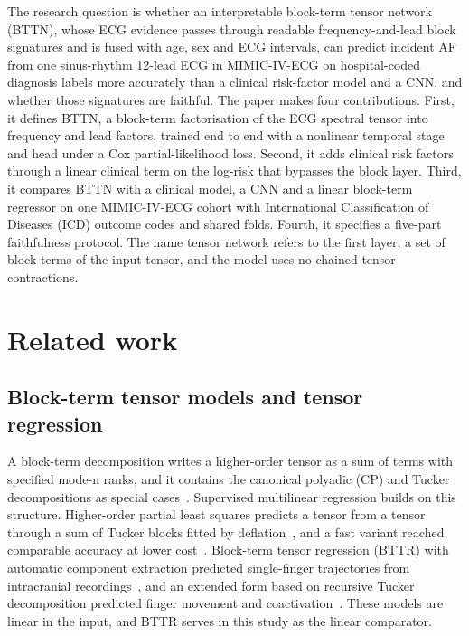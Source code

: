 \documentclass[preprint,12pt]{elsarticle}
\begin{document}
The research question is whether an interpretable block-term tensor network (BTTN), whose ECG evidence passes through readable frequency-and-lead block signatures and is fused with age, sex and ECG intervals, can predict incident AF from one sinus-rhythm 12-lead ECG in MIMIC-IV-ECG on hospital-coded diagnosis labels more accurately than a clinical risk-factor model and a CNN, and whether those signatures are faithful. The paper makes four contributions. First, it defines BTTN, a block-term factorisation of the ECG spectral tensor into frequency and lead factors, trained end to end with a nonlinear temporal stage and head under a Cox partial-likelihood loss. Second, it adds clinical risk factors through a linear clinical term on the log-risk that bypasses the block layer. Third, it compares BTTN with a clinical model, a CNN and a linear block-term regressor on one MIMIC-IV-ECG cohort with International Classification of Diseases (ICD) outcome codes and shared folds. Fourth, it specifies a five-part faithfulness protocol. The name tensor network refers to the first layer, a set of block terms of the input tensor, and the model uses no chained tensor contractions.

\section{Related work}

\subsection{Block-term tensor models and tensor regression}

A block-term decomposition writes a higher-order tensor as a sum of terms with specified mode-n ranks, and it contains the canonical polyadic (CP) and Tucker decompositions as special cases~\cite{delathauwer2008}. Supervised multilinear regression builds on this structure. Higher-order partial least squares predicts a tensor from a tensor through a sum of Tucker blocks fitted by deflation~\cite{zhao2013}, and a fast variant reached comparable accuracy at lower cost~\cite{camarrone2019}. Block-term tensor regression (BTTR) with automatic component extraction predicted single-finger trajectories from intracranial recordings~\cite{faes2024}, and an extended form based on recursive Tucker decomposition predicted finger movement and coactivation~\cite{faes2022}. These models are linear in the input, and BTTR serves in this study as the linear comparator.
\end{document}
